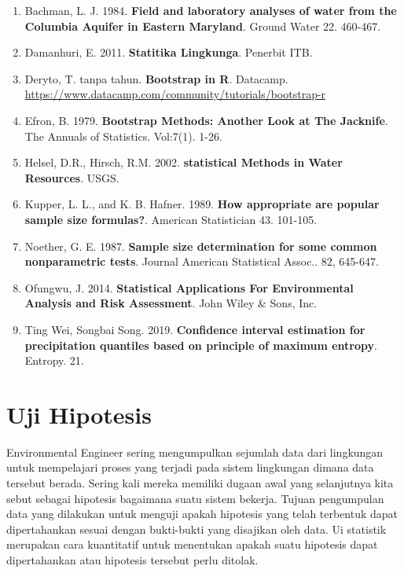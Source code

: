 \documentclass[]{book}
\providecommand{\tightlist}{%
  \setlength{\itemsep}{0pt}\setlength{\parskip}{0pt}}
\begin{document}
\begin{enumerate}
\def\labelenumi{\arabic{enumi}.}
\tightlist
\item
  Bachman, L. J. 1984. \textbf{Field and laboratory analyses of water
  from the Columbia Aquifer in Eastern Maryland}. Ground Water 22.
  460-467.
\item
  Damanhuri, E. 2011. \textbf{Statitika Lingkunga}. Penerbit ITB.
\item
  Deryto, T. tanpa tahun. \textbf{Bootstrap in R}. Datacamp.
  \url{https://www.datacamp.com/community/tutorials/bootstrap-r}
\item
  Efron, B. 1979. \textbf{Bootstrap Methods: Another Look at The
  Jacknife}. The Annuals of Statistics. Vol:7(1). 1-26.
\item
  Helsel, D.R., Hirsch, R.M. 2002. \textbf{statistical Methods in Water
  Resources}. USGS.
\item
  Kupper, L. L., and K. B. Hafner. 1989. \textbf{How appropriate are
  popular sample size formulas?}. American Statistician 43. 101-105.
\item
  Noether, G. E. 1987. \textbf{Sample size determination for some common
  nonparametric tests}. Journal American Statistical Assoc.. 82,
  645-647.
\item
  Ofungwu, J. 2014. \textbf{Statistical Applications For Environmental
  Analysis and Risk Assessment}. John Wiley \& Sons, Inc.
\item
  Ting Wei, Songbai Song. 2019. \textbf{Confidence interval estimation
  for precipitation quantiles based on principle of maximum entropy}.
  Entropy. 21.
\end{enumerate}

\chapter{Uji Hipotesis}\label{uji-hipotesis}

Environmental Engineer sering mengumpulkan sejumlah data dari lingkungan
untuk mempelajari proses yang terjadi pada sistem lingkungan dimana data
tersebut berada. Sering kali mereka memiliki dugaan awal yang
selanjutnya kita sebut sebagai hipotesis bagaimana suatu sistem bekerja.
Tujuan pengumpulan data yang dilakukan untuk menguji apakah hipotesis
yang telah terbentuk dapat dipertahankan sesuai dengan bukti-bukti yang
disajikan oleh data. Ui statistik merupakan cara kuantitatif untuk
menentukan apakah suatu hipotesis dapat dipertahankan atau hipotesis
tersebut perlu ditolak.
\end{document}
